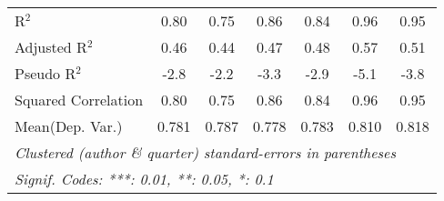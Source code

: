 \begin{tabular}{lcccccc}
   R$^2$                                                      & 0.80        & 0.75    & 0.86    & 0.84    & 0.96        & 0.95\\  
   Adjusted R$^2$                                             & 0.46        & 0.44    & 0.47    & 0.48    & 0.57        & 0.51\\  
   Pseudo R$^2$                                               & -2.8        & -2.2    & -3.3    & -2.9    & -5.1        & -3.8\\  
   Squared Correlation                                        & 0.80        & 0.75    & 0.86    & 0.84    & 0.96        & 0.95\\  
Mean(Dep. Var.) & 0.781 & 0.787 & 0.778 & 0.783 & 0.810 & 0.818 \\
   \midrule \midrule
   \multicolumn{7}{l}{\emph{Clustered (author \& quarter) standard-errors in parentheses}}\\
   \multicolumn{7}{l}{\emph{Signif. Codes: ***: 0.01, **: 0.05, *: 0.1}}\\
\end{tabular}
\par\endgroup
